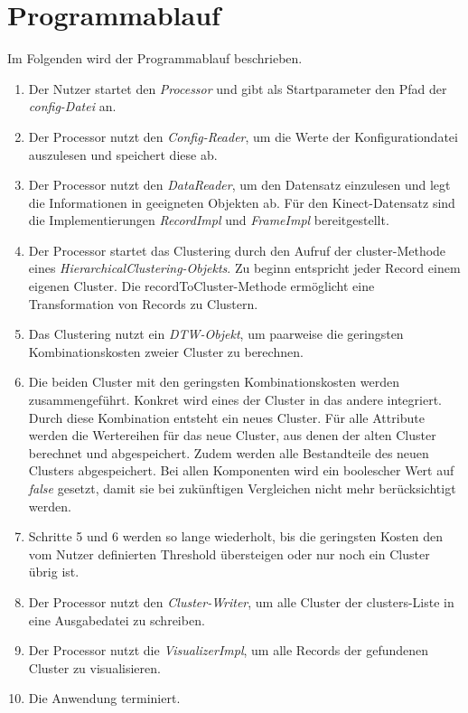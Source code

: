\section{Programmablauf}
\label{4-Programmablauf}
Im Folgenden wird der Programmablauf beschrieben.
\begin{enumerate}
    \item Der Nutzer startet den \emph{Processor}
    und gibt als Startparameter den Pfad der \emph{config-Datei} an.
    \item Der Processor nutzt den \emph{Config-Reader}, um die Werte der Konfigurationdatei auszulesen
    und speichert diese ab.
    \item Der Processor nutzt den \emph{DataReader}, um den Datensatz einzulesen
    und legt die Informationen in geeigneten Objekten ab.
    Für den Kinect-Datensatz sind die Implementierungen \emph{RecordImpl} und \emph{FrameImpl}
    bereitgestellt.
    \item Der Processor startet das Clustering durch den Aufruf der cluster-Methode
    eines \emph{HierarchicalClustering-Objekts}.
    Zu beginn entspricht jeder Record einem eigenen Cluster.
    Die recordToCluster-Methode ermöglicht eine Transformation von Records zu Clustern.
    \item Das Clustering nutzt ein \emph{\ac{DTW}-Objekt},
    um paarweise die geringsten Kombinationskosten zweier Cluster zu berechnen.
    \item Die beiden Cluster mit den geringsten Kombinationskosten werden zusammengeführt.
    Konkret wird eines der Cluster in das andere integriert.
    Durch diese Kombination entsteht ein neues Cluster.
    Für alle Attribute werden die Wertereihen für das neue Cluster, aus denen der alten Cluster berechnet und abgespeichert.
    Zudem werden alle Bestandteile des neuen Clusters abgespeichert.
    Bei allen Komponenten wird ein boolescher Wert auf \emph{false} gesetzt,
    damit sie bei zukünftigen Vergleichen nicht mehr berücksichtigt werden.
    \item Schritte 5 und 6 werden so lange wiederholt, bis die geringsten Kosten den vom Nutzer definierten Threshold übersteigen
    oder nur noch ein Cluster übrig ist.
    \item Der Processor nutzt den \emph{Cluster-Writer}, um alle Cluster der clusters-Liste
    in eine Ausgabedatei zu schreiben.
    \item Der Processor nutzt die \emph{VisualizerImpl}, um alle Records der gefundenen Cluster zu visualisieren.
    \item Die Anwendung terminiert. 
\end{enumerate}
